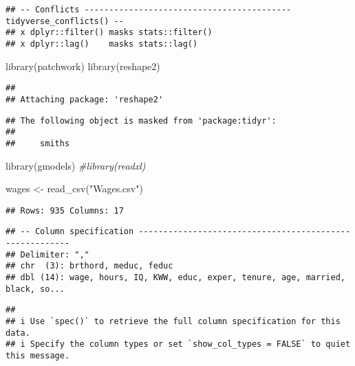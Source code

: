 \documentclass[
]{article}
\newenvironment{Shaded}{\begin{snugshade}}{\end{snugshade}}
\newcommand{\CommentTok}[1]{\textcolor[rgb]{0.56,0.35,0.01}{\textit{#1}}}
\newcommand{\FunctionTok}[1]{\textcolor[rgb]{0.00,0.00,0.00}{#1}}
\newcommand{\NormalTok}[1]{#1}
\newcommand{\OtherTok}[1]{\textcolor[rgb]{0.56,0.35,0.01}{#1}}
\newcommand{\StringTok}[1]{\textcolor[rgb]{0.31,0.60,0.02}{#1}}
\begin{document}
\begin{verbatim}
## -- Conflicts ------------------------------------------ tidyverse_conflicts() --
## x dplyr::filter() masks stats::filter()
## x dplyr::lag()    masks stats::lag()
\end{verbatim}

\begin{Shaded}
\begin{Highlighting}[]
\FunctionTok{library}\NormalTok{(patchwork)}
\FunctionTok{library}\NormalTok{(reshape2)}
\end{Highlighting}
\end{Shaded}

\begin{verbatim}
## 
## Attaching package: 'reshape2'
\end{verbatim}

\begin{verbatim}
## The following object is masked from 'package:tidyr':
## 
##     smiths
\end{verbatim}

\begin{Shaded}
\begin{Highlighting}[]
\FunctionTok{library}\NormalTok{(gmodels)}
\CommentTok{\#library(readxl)}
\end{Highlighting}
\end{Shaded}

\begin{Shaded}
\begin{Highlighting}[]
\NormalTok{wages }\OtherTok{\textless{}{-}} \FunctionTok{read\_csv}\NormalTok{(}\StringTok{"Wages.csv"}\NormalTok{)}
\end{Highlighting}
\end{Shaded}

\begin{verbatim}
## Rows: 935 Columns: 17
\end{verbatim}

\begin{verbatim}
## -- Column specification --------------------------------------------------------
## Delimiter: ","
## chr  (3): brthord, meduc, feduc
## dbl (14): wage, hours, IQ, KWW, educ, exper, tenure, age, married, black, so...
\end{verbatim}

\begin{verbatim}
## 
## i Use `spec()` to retrieve the full column specification for this data.
## i Specify the column types or set `show_col_types = FALSE` to quiet this message.
\end{verbatim}
\end{document}
